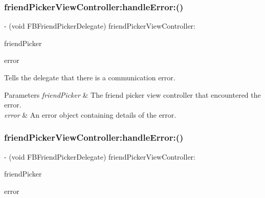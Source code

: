 \subsubsection{\texorpdfstring{friend\+Picker\+View\+Controller\+:handle\+Error\+:()}{friendPickerViewController:handleError:()}\hspace{0.1cm}{\footnotesize\ttfamily [1/5]}}
{\footnotesize\ttfamily -\/ (void F\+B\+Friend\+Picker\+Delegate) friend\+Picker\+View\+Controller\+: \begin{DoxyParamCaption}\item[{(\hyperlink{interfaceFBFriendPickerViewController}{F\+B\+Friend\+Picker\+View\+Controller} $\ast$)}]{friend\+Picker }\item[{handleError:(N\+S\+Error $\ast$)}]{error }\end{DoxyParamCaption}\hspace{0.3cm}{\ttfamily [optional]}}

Tells the delegate that there is a communication error.


\begin{DoxyParams}{Parameters}
{\em friend\+Picker} & The friend picker view controller that encountered the error. \\
\hline
{\em error} & An error object containing details of the error. \\
\hline
\end{DoxyParams}
\mbox{\label{protocolFBFriendPickerDelegate_01-p_ac4b023444722c5b44144284f593c8f67}} 
\subsubsection{\texorpdfstring{friend\+Picker\+View\+Controller\+:handle\+Error\+:()}{friendPickerViewController:handleError:()}\hspace{0.1cm}{\footnotesize\ttfamily [2/5]}}
{\footnotesize\ttfamily -\/ (void F\+B\+Friend\+Picker\+Delegate) friend\+Picker\+View\+Controller\+: \begin{DoxyParamCaption}\item[{(\hyperlink{interfaceFBFriendPickerViewController}{F\+B\+Friend\+Picker\+View\+Controller} $\ast$)}]{friend\+Picker }\item[{handleError:(N\+S\+Error $\ast$)}]{error }\end{DoxyParamCaption}\hspace{0.3cm}{\ttfamily [optional]}}


